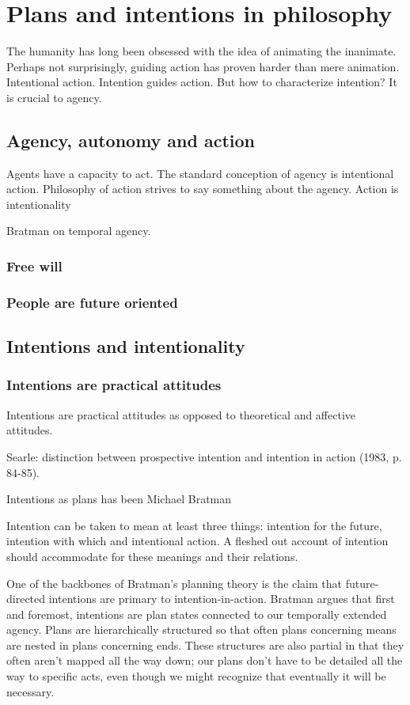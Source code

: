 \section{Plans and intentions in philosophy}
The humanity has long been obsessed with the idea of animating the inanimate. Perhaps not surprisingly, guiding action has proven harder than mere animation. Intentional action. Intention guides action. But how to characterize intention? It is crucial to agency.

\subsection{Agency, autonomy and action}
Agents have a capacity to act. The standard conception of agency is intentional action. Philosophy of action strives to say something about the agency. Action is  intentionality

Bratman on temporal agency.
\subsubsection{Free will}
\subsubsection{People are future oriented}
\subsection{Intentions and intentionality}
\subsubsection{Intentions are practical attitudes}
Intentions are practical attitudes as opposed to theoretical and affective attitudes.


Searle: distinction between prospective intention and intention in action (1983, p. 84-85).

Intentions as plans has been Michael Bratman

Intention can be taken to mean at least three things: intention for the future, intention with which and intentional action. A fleshed out account of intention should accommodate for these meanings and their relations.

One of the backbones of Bratman's planning theory is the claim that future-directed intentions are primary to intention-in-action. Bratman argues that first and foremost, intentions are plan states connected to our temporally extended agency. Plans are hierarchically structured so that often plans concerning means are nested in plans concerning ends. These structures are also partial in that they often aren't mapped all the way down; our plans don't have to be detailed all the way to specific acts, even though we might recognize that eventually it will be necessary. \citep*[p.~15]{bratman_shared_2014}

